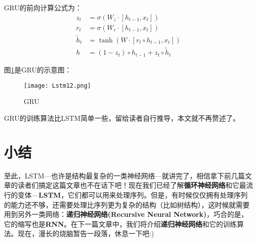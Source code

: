 GRU的前向计算公式为：
\begin{align*}
	{z}_t         & =\sigma(W_z\cdot[{h}_{t-1},{x}_t])               \\
	{r}_t         & =\sigma(W_r\cdot[{h}_{t-1},{x}_t])               \\
	{\tilde{h}}_t & =\tanh(W\cdot[{r}_t\circ{h}_{t-1},{x}_t])        \\
	{h}           & =(1-{z}_t)\circ{h}_{t-1}+{z}_t\circ{\tilde{h}}_t
\end{align*}


图\ref{fig:Lstm12}是GRU的示意图：

\begin{figure}[!h]
	\centering
	\texttt{[image: Lstm12.png]}
	\caption{GRU}
	\label{fig:Lstm12}
\end{figure}

GRU的训练算法比LSTM简单一些，留给读者自行推导，本文就不再赘述了。

\section{小结}

至此，LSTM---也许是结构最复杂的一类神经网络---就讲完了，相信拿下前几篇文章的读者们搞定这篇文章也不在话下吧！现在我们已经了解\textbf{循环神经网络}和它最流行的变体---\textbf{LSTM}，它们都可以用来处理序列。但是，有时候仅仅拥有处理序列的能力还不够，还需要处理比序列更为复杂的结构（比如树结构），这时候就需要用到另外一类网络：\textbf{递归神经网络(Recursive Neural Network)}，巧合的是，它的缩写也是\textbf{RNN}。在下一篇文章中，我们将介绍\textbf{递归神经网络}和它的训练算法。现在，漫长的烧脑暂告一段落，休息一下吧:)






